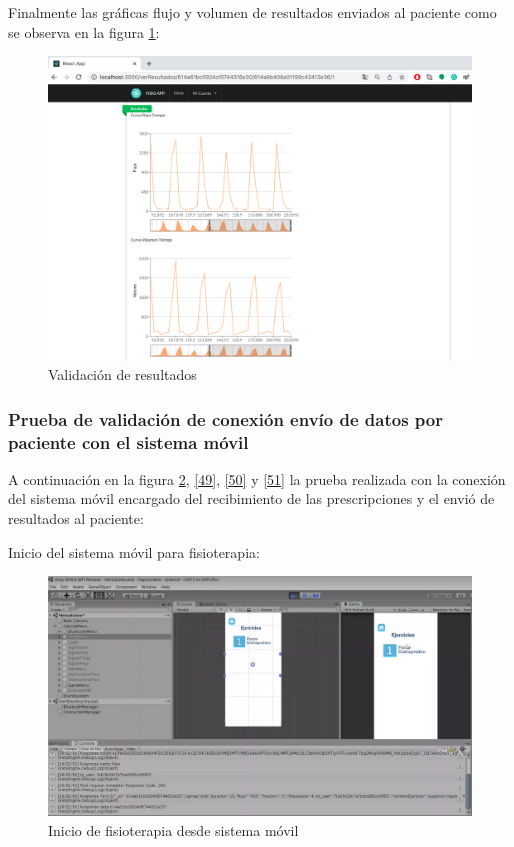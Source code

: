 \documentclass[12pt]{article}
\begin{document}
Finalmente las gráficas flujo y volumen de resultados enviados al paciente como se observa en la figura \ref{47}:

\begin{figure}[ht]
\centering
\includegraphics[scale=0.3]{imag/TEST8Graficas.png}
\caption{Validación de resultados }
\label{47}
\end{figure}
\FloatBarrier


\subsubsection{Prueba de validación de conexión envío de datos por paciente con el sistema móvil }

A continuación en la figura \ref{48}, \ref{49}, \ref{50} y \ref{51} la prueba realizada con la conexión del sistema móvil encargado del recibimiento de las prescripciones y el envió de resultados al paciente: 

Inicio del sistema móvil para fisioterapia:

\begin{figure}[ht]
\centering
\includegraphics[scale=0.3]{imag/TESTseleccionejericiomobile.png}
\caption{Inicio de fisioterapia desde sistema móvil }
\label{48}
\end{figure}
\FloatBarrier
\end{document}
